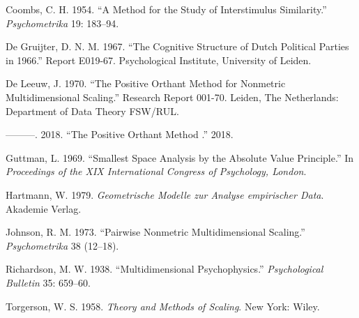 \documentclass[
  12pt,
]{article}
\newlength{\cslhangindent}
\newenvironment{CSLReferences}[2] %
 {\begin{list}{}{%
  \setlength{\itemindent}{0pt}
  \setlength{\leftmargin}{0pt}
  \setlength{\parsep}{0pt}
  \ifodd #1
   \setlength{\leftmargin}{\cslhangindent}
   \setlength{\itemindent}{-1\cslhangindent}
  \fi
  \setlength{\itemsep}{#2\baselineskip}}}
 {\end{list}}
\begin{document}
\label{refs}
\begin{CSLReferences}{1}{0}
Coombs, C. H. 1954. {``A Method for the Study of Interstimulus Similarity.''} \emph{Psychometrika} 19: 183--94.

De Gruijter, D. N. M. 1967. {``{The Cognitive Structure of Dutch Political Parties in 1966}.''} Report E019-67. Psychological Institute, University of Leiden.

De Leeuw, J. 1970. {``The Positive Orthant Method for Nonmetric Multidimensional Scaling.''} Research Report 001-70. Leiden, The Netherlands: Department of Data Theory FSW/RUL.

---------. 2018. {``{The Positive Orthant Method }.''} 2018.

Guttman, L. 1969. {``{Smallest Space Analysis by the Absolute Value Principle}.''} In \emph{{Proceedings of the XIX International Congress of Psychology, London}}.

Hartmann, W. 1979. \emph{{Geometrische Modelle zur Analyse empirischer Data}}. Akademie Verlag.

Johnson, R. M. 1973. {``{Pairwise Nonmetric Multidimensional Scaling}.''} \emph{Psychometrika} 38 (12--18).

Richardson, M. W. 1938. {``Multidimensional Psychophysics.''} \emph{Psychological Bulletin} 35: 659--60.

Torgerson, W. S. 1958. \emph{{Theory and Methods of Scaling}}. New York: Wiley.

\end{CSLReferences}
\end{document}
